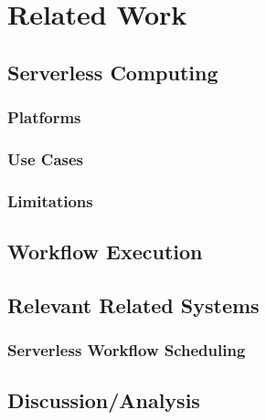 \chapter{Related Work}
\chaptoc
\label{chap:rw}

\section{Serverless Computing}

\subsection{Platforms}

\subsection{Use Cases}

\subsection{Limitations}

\section{Workflow Execution}

\section{Relevant Related Systems}

\subsection{Serverless Workflow Scheduling}

\section{Discussion/Analysis}
